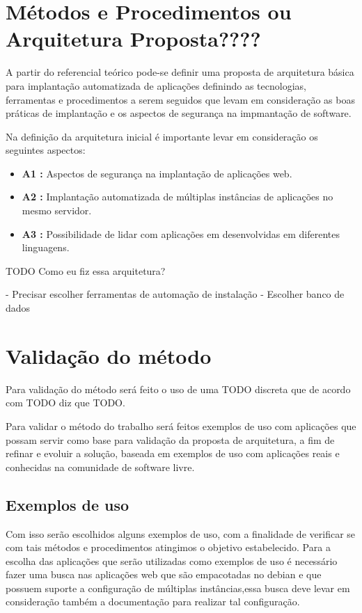 \section{Métodos e Procedimentos ou Arquitetura Proposta????}

A partir do referencial teórico pode-se definir uma proposta de
arquitetura básica para implantação automatizada de aplicações definindo as
tecnologias, ferramentas e  procedimentos a serem seguidos que levam em consideração as boas
práticas de implantação e os aspectos de segurança na impmantação de software.

Na definição da arquitetura inicial é importante levar em consideração os seguintes
aspectos:

\begin{itemize}
  \item  \textbf{A1 :} Aspectos de segurança na implantação de aplicações web.
  \item  \textbf{A2 :} Implantação automatizada de múltiplas instâncias de
   aplicações no mesmo servidor.
  \item  \textbf{A3 :} Possibilidade de lidar com aplicações em desenvolvidas em
  diferentes linguagens.
\end{itemize}

TODO
Como eu fiz essa arquitetura?

- Precisar escolher ferramentas de automação de instalação
- Escolher banco de dados


\section{Validação do método}

Para validação do método será feito o uso de uma TODO discreta que de acordo com
TODO diz que TODO.

Para validar o método do trabalho será feitos exemplos de uso com aplicações
que possam servir como base para validação da proposta de arquitetura, a fim de
refinar e evoluir a solução, baseada em exemplos de uso com aplicações reais e conhecidas
na comunidade de software livre.


\subsection{Exemplos de uso}

Com isso serão escolhidos alguns exemplos de uso, com a
finalidade de verificar se com tais métodos e procedimentos atingimos o objetivo
estabelecido. Para a escolha das aplicações que serão utilizadas como exemplos
de uso é necessário fazer uma busca nas aplicações web que são empacotadas no
debian e que possuem suporte a configuração de múltiplas instâncias,essa busca
deve levar em consideração também a documentação para realizar tal configuração.

